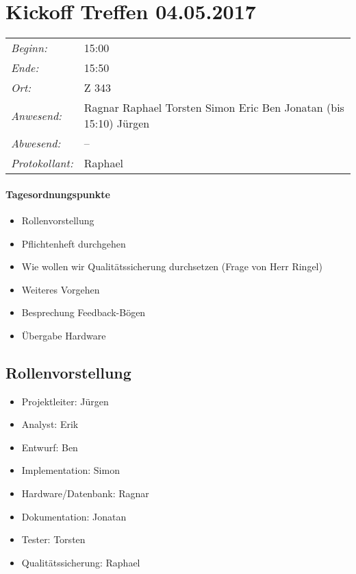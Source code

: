 \documentclass{scrartcl}
\date{04.05.2017}
\begin{document}
\maketitle
\section{Kickoff Treffen 04.05.2017}
\begin{tabular}[t]{p{.25\linewidth} p{.25\linewidth}}
\emph{Beginn:}				& 15:00\\
\emph{Ende:}					& 15:50\\
\emph{Ort:}						& Z 343\\
\emph{Anwesend:}	& 
Ragnar\newline
Raphael\newline
Torsten\newline
Simon\newline
Eric\newline	%
Ben\newline
Jonatan (bis 15:10)\newline
Jürgen
\\
\emph{Abwesend:}		 & 
--
\\
\emph{Protokollant:}& Raphael
\end{tabular}
\paragraph{Tagesordnungspunkte}
\begin{itemize}
    \item Rollenvorstellung
    \item Pflichtenheft durchgehen
    \item Wie wollen wir Qualitätssicherung durchsetzen (Frage von Herr Ringel)
    \item Weiteres Vorgehen
    \item Besprechung Feedback-Bögen
    \item Übergabe Hardware
\end{itemize}

\subsection{Rollenvorstellung}
\begin{itemize}
\item Projektleiter: Jürgen
\item Analyst: Erik
\item Entwurf: Ben
\item Implementation: Simon
\item Hardware/Datenbank: Ragnar 
\item Dokumentation: Jonatan
\item Tester: Torsten
\item Qualitätssicherung: Raphael 
\end{itemize}
\end{document}

